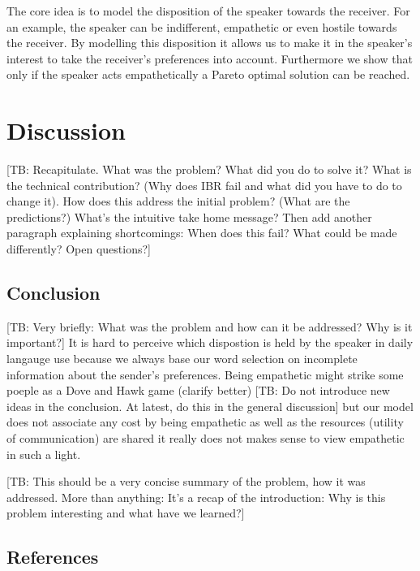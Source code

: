 \documentclass[10pt]{article}
\newcommand{\tb}[1]{\textcolor[rgb]{.8,.33,.0}{[TB: #1]}}%
\begin{document}
The core idea is to model the disposition of the speaker towards the receiver. For an example, the speaker can be indifferent, empathetic or even hostile towards the receiver. By modelling this disposition it allows us to make it in the speaker's interest to take the receiver's preferences into account. Furthermore we show that only if the speaker acts empathetically a Pareto optimal solution can be reached.

\section{Discussion}

\tb{Recapitulate. What was the problem? What did you do to solve it? What is the technical contribution? (Why does IBR fail and what did you have to do to change it). How does this address the initial problem? (What are the predictions?) What's the intuitive take home message? Then add another paragraph explaining shortcomings: When does this fail? What could be made differently? Open questions?}

\subsection{Conclusion}

\tb{Very briefly: What was the problem and how can it be addressed? Why is it important?}
It is hard to perceive which dispostion is held by the speaker in daily langauge use because we always base our word selection on incomplete information about the sender's preferences.
Being empathetic might strike some poeple as a Dove and Hawk game (clarify better) \tb{Do not introduce new ideas in the conclusion. At latest, do this in the general discussion} but our model does not associate any cost by being empathetic as well as the resources (utility of communication) are shared it really does not makes sense to view empathetic in such a light.

\tb{This should be a very concise summary of the problem, how it was addressed. More than anything: It's a recap of the introduction: Why is this problem interesting and what have we learned?}
\subsection{References}
\end{document}
